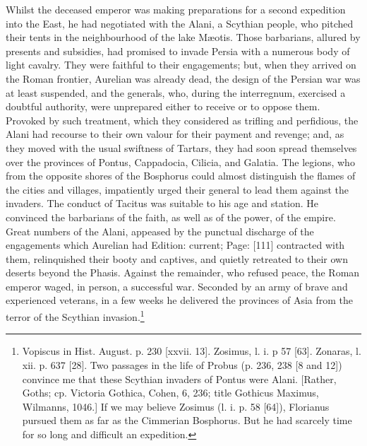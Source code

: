 Whilst the deceased emperor was making preparations for a second expedition into the East, he had negotiated with the Alani, a Scythian people, who pitched their tents in the neighbourhood of the lake Mæotis. Those barbarians, allured by presents and subsidies, had promised to invade Persia with a numerous body of light cavalry. They were faithful to their engagements; but, when they arrived on the Roman frontier, Aurelian was already dead, the design of the Persian war was at least suspended, and the generals, who, during the interregnum, exercised a doubtful authority, were unprepared either to receive or to oppose them. Provoked by such treatment, which they considered as trifling and perfidious, the Alani had recourse to their own valour for their payment and revenge; and, as they moved with the usual swiftness of Tartars, they had soon spread themselves over the provinces of Pontus, Cappadocia, Cilicia, and Galatia. The legions, who from the opposite shores of the Bosphorus could almost distinguish the flames of the cities and villages, impatiently urged their general to lead them against the invaders. The conduct of Tacitus was suitable to his age and station. He convinced the barbarians of the faith, as well as of the power, of the empire. Great numbers of the Alani, appeased by the punctual discharge of the engagements which Aurelian had Edition: current; Page: [111] contracted with them, relinquished their booty and captives, and quietly retreated to their own deserts beyond the Phasis. Against the remainder, who refused peace, the Roman emperor waged, in person, a successful war. Seconded by an army of brave and experienced veterans, in a few weeks he delivered the provinces of Asia from the terror of the Scythian invasion.\footnote{Vopiscus in Hist. August. p. 230 [xxvii. 13]. Zosimus, l. i. p 57 [63]. Zonaras, l. xii. p. 637 [28]. Two passages in the life of Probus (p. 236, 238 [8 and 12]) convince me that these Scythian invaders of Pontus were Alani. [Rather, Goths; cp. Victoria Gothica, Cohen, 6, 236; title Gothicus Maximus, Wilmanns, 1046.] If we may believe Zosimus (l. i. p. 58 [64]), Florianus pursued them as far as the Cimmerian Bosphorus. But he had scarcely time for so long and difficult an expedition.}

